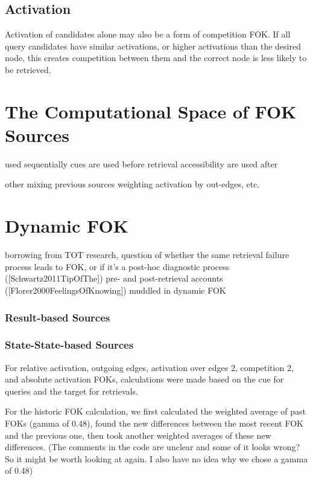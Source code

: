 \documentclass[10pt,letterpaper]{article}
\begin{document}
\subsection{Activation}
	Activation of candidates alone may also be a form of competition FOK. If all query candidates have similar activations, or higher activations than the desired node, this creates competition between them and the correct node is less likely to be retrieved.


\section{The Computational Space of FOK Sources}

used sequentially \cite{Koriat2001TheCombinedContributions}
cues are used before retrieval
accessibility are used after

other mixing previous sources
    weighting activation by out-edges, etc.

\section{Dynamic FOK}

borrowing from TOT research, question of whether the same retrieval failure process leads to FOK, or if it's a post-hoc diagnostic process ([Schwartz2011TipOfThe])
pre- and post-retrieval accounts ([Florer2000FeelingsOfKnowing]) muddled in dynamic FOK

\subsubsection{Result-based Sources}

\subsubsection{State-State-based Sources}

For relative activation, outgoing edges, activation over edges 2, competition 2, and absolute activation FOKs, calculations were made based on the cue for queries and the target for retrievals.

For the historic FOK calculation, we first calculated the weighted average of past FOKs (gamma of 0.48), found the new differences between the most recent FOK and the previous one, then took another weighted averages of these new differences. (The comments in the code are unclear and some of it looks wrong? So it might be worth looking at again. I also have no idea why we chose a gamma of 0.48)
\end{document}
